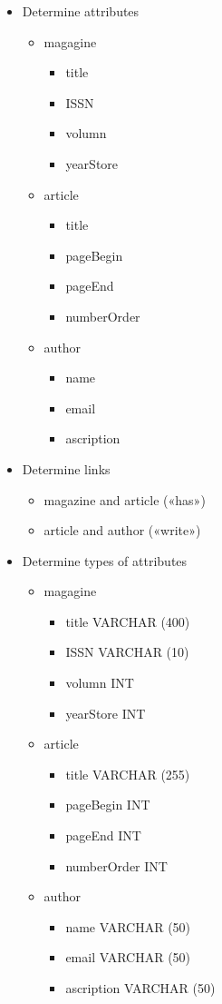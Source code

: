 \documentclass[13pt,a4paper]{report}
\begin{document}
\begin{itemize}
\item Determine attributes
	\begin{itemize}
	\item magagine
		\begin{itemize}
		\item title
		\item ISSN
		\item volumn
		\item yearStore
		\end{itemize}
	\item article
		\begin{itemize}
		\item title
		\item pageBegin
		\item pageEnd
		\item numberOrder
		\end{itemize}
	\item author
		\begin{itemize}
		\item name
		\item email
		\item ascription
		\end{itemize}
	\end{itemize}

\item Determine links
	\begin{itemize}
	\item magazine and article («has»)
	\item article and author («write»)
	\end{itemize}

\item Determine types of attributes
	\begin{itemize}
	\item magagine
		\begin{itemize}
		\item title VARCHAR (400)
		\item ISSN VARCHAR (10)
		\item volumn INT
		\item yearStore INT
		\end{itemize}
	\item article
		\begin{itemize}
		\item title VARCHAR (255)
		\item pageBegin INT 
		\item pageEnd INT 
		\item numberOrder INT
		\end{itemize}
	\item author
		\begin{itemize}
		\item name VARCHAR (50)
		\item email VARCHAR (50)
		\item ascription VARCHAR (50)
		\end{itemize}
	\end{itemize}


\end{itemize}
\end{document}
